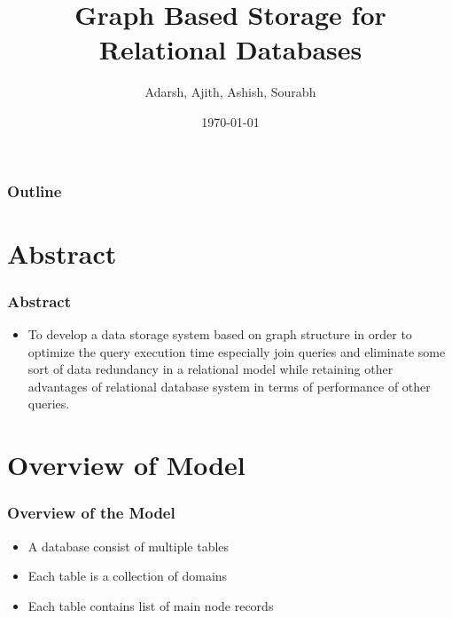 \documentclass[12pt,xcolor=dvipsnames]{beamer}
\title{Graph Based Storage for Relational Databases}
\author{Adarsh, Ajith, Ashish, Sourabh}
\date{\today}
\begin{document}
\begin{frame}
\titlepage
\end{frame}


\begin{frame}
\frametitle{Outline}
\begin{multicols}{2}
\tableofcontents[hideallsubsections]
\end{multicols}
\end{frame}

\section{Abstract}
\begin{frame}
\frametitle{Abstract}
\begin{itemize}
  \item To develop a data storage system based on graph structure in order to optimize the query execution time especially join queries and eliminate some sort of data redundancy in a relational model while retaining other advantages of relational database system in terms of performance of other queries.
\end{itemize}
\end{frame}

\section{Overview of Model}
\begin{frame}
 \frametitle{Overview of the Model}
 \begin{itemize}
  \item<1-> A database consist of multiple tables
  \item<2-> Each table is a collection of domains
  \item<3-> Each table contains list of main node records
 \end{itemize}
\end{frame}
\end{document}
